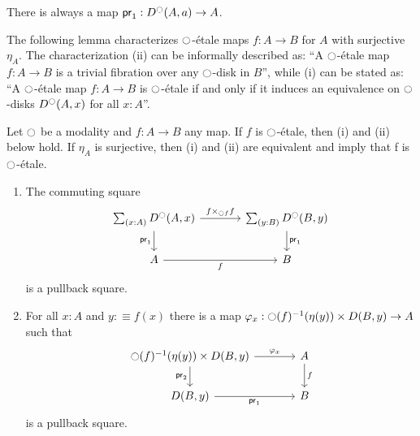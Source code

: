 \documentclass[9pt,twosided]{amsart}
\begin{document}
There is always a map $\mathsf{pr}_{1}:D^{\ocircle}(A,a)\to A$.

The following lemma characterizes ${\ocircle}$-étale maps $f:A\to B$ for $A$ with surjective $\eta_A$.
The characterization (ii) can be informally described as: ``A ${\ocircle}$-étale map $f:A\to B$ is a trivial fibration over any ${\ocircle}$-disk  in $B$'',
while (i) can be stated as: ``A ${\ocircle}$-étale map $f:A\to B$ is ${\ocircle}$-étale if and only if it induces an equivalence on ${\ocircle}$-disks $D^{\ocircle}(A,x)$ for all $x:A$''. 

\begin{lem}\label{lem:etale_char}
  Let ${\ocircle}$ be a modality and $f:A\to B$ any map.
  If $f$ is ${\ocircle}$-\'etale, then (i) and (ii) below hold.
  If $\eta_A$ is surjective, then (i) and (ii) are equivalent and imply that f is ${\ocircle}$-étale.
\begin{enumerate}
\item The commuting square
\begin{equation*}
\begin{tikzcd}[column sep=large]
\sm{x:A}D^\modal(A,x) \arrow[d,swap,"\proj 1"] \arrow[r,"{f\times_{\modal f} f}"] & \sm{y:B}D^\modal(B,y) \arrow[d,"\proj 1"] \\
A \arrow[r,swap,"f"] & B
\end{tikzcd}
\end{equation*}
is a pullback square.
\item For all $x:A$ and $y:\equiv f(x)$ there is a map $\varphi_x:{\ocircle}(f)^{-1}(\eta(y))\times D(B,y)\to A$ such that
  \begin{equation*}
    \begin{tikzcd}[column sep=large]
      \modal(f)^{-1}(\eta(y))\arrow[r,"\varphi_x"]\arrow[d,swap,"\proj 2"]\times D(B,y)   &  A\arrow[d,"f"] \\
      D(B,y)\arrow[r,"\proj 1",swap]  & B
    \end{tikzcd}
  \end{equation*}
is a pullback square.
\end{enumerate}
\end{lem}
\end{document}
